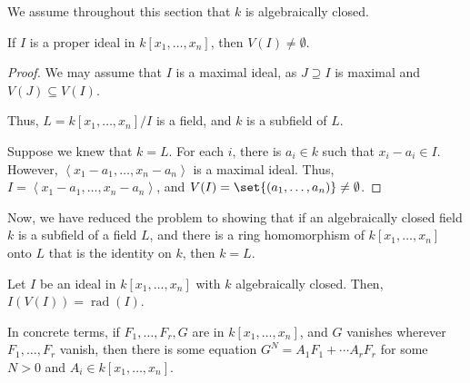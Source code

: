 \documentclass[10pt]{mypackage}
\begin{document}
We assume throughout this section that $k$ is algebraically closed.
\begin{theorem}
  If $I$ is a proper ideal in $k\left[ x_1,\dots,x_n \right]$, then $V(I)\neq \emptyset$.
\end{theorem}
\begin{proof}
  We may assume that $I$ is a maximal ideal, as $J\supseteq I$ is maximal and $V(J)\subseteq V(I)$.\newline

  Thus, $L = k\left[ x_1,\dots,x_n \right]/I$ is a field, and $k$ is a subfield of $L$.\newline

  Suppose we knew that $k = L$. For each $i$, there is $a_i\in k$ such that $x_i - a_i\in I$. However, $\left\langle x_1-a_1,\dots,x_n-a_n \right\rangle$ is a maximal ideal. Thus, $I = \left\langle x_1-a_1,\dots,x_n-a_n \right\rangle$, and $V(I) = \set{\left( a_1,\dots,a_n \right)}\neq \emptyset$.
\end{proof}
Now, we have reduced the problem to showing that if an algebraically closed field $k$ is a subfield of a field $L$, and there is a ring homomorphism of $k\left[ x_1,\dots,x_n \right]$ onto $L$ that is the identity on $k$, then $k = L$.
\begin{theorem}
  Let $I$ be an ideal in $k\left[ x_1,\dots,x_n \right]$ with $k$ algebraically closed. Then, $I(V(I)) = \operatorname{rad}\left( I \right)$.
\end{theorem}

\begin{remark}
  In concrete terms, if $F_1,\dots,F_r,G$ are in $k\left[ x_1,\dots,x_n \right]$, and $G$ vanishes wherever $F_1,\dots,F_r$ vanish, then there is some equation $G^N = A_1F_1 + \cdots A_rF_r$ for some $N > 0$ and $A_i\in k\left[ x_1,\dots,x_n \right]$.
\end{remark}
\end{document}
